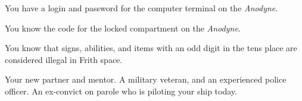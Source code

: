 \documentclass[char]{guildcamp4}
\begin{document}
\begin{itemz}[Notes]
	\item You have a login and password for the computer terminal on the \emph{Anodyne}.
	\item You know the code for the locked compartment on the \emph{Anodyne}.
	\item You know that signs, abilities, and items with an odd digit in the tens place are considered illegal in Frith space.
\end{itemz}

\begin{contacts}
	\contact{\cCbad{}} Your new partner and mentor. A military veteran, and an experienced police officer.
	\contact{\cPilot{}}	An ex-convict on parole who is piloting your ship today.
\end{contacts}
\end{document}
